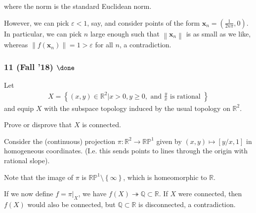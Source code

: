 \begin{solution}
where the norm is the standard Euclidean norm.

However, we can pick \(\varepsilon < 1\), say, and consider points of
the form \(\mathbf{x}_n = (\frac{1}{2n\pi}, 0)\). In particular, we can
pick \(n\) large enough such that
\({\left\lVert {\mathbf{x}_n} \right\rVert}\) is as small as we like,
whereas
\({\left\lVert {f(\mathbf{x}_n)} \right\rVert} = 1 > \varepsilon\) for
all \(n\), a contradiction.

\end{solution}

\hypertarget{fall-18-done}{%
\subsubsection{\texorpdfstring{11 (Fall '18)
\(\done\)}{11 (Fall '18) \textbackslash done}}\label{fall-18-done}}

Let
\begin{align*} X=\left\{(x, y) \in \mathbb{R}^{2} | x>0, y \geq 0, \text { and } \frac{y}{x} \text { is rational }\right\} \end{align*}
and equip \(X\) with the subspace topology induced by the usual topology
on \({\mathbb{R}}^2\).

Prove or disprove that \(X\) is connected.


\begin{solution}

\hfill

\begin{concept}

\hfill

\end{concept}

Consider the (continuous) projection
\(\pi: {\mathbb{R}}^2 \to {\mathbb{RP}}^1\) given by
\((x, y) \mapsto [y/x, 1]\) in homogeneous coordinates. (I.e. this sends
points to lines through the origin with rational slope).

Note that the image of \(\pi\) is
\({\mathbb{RP}}^1\setminus\left\{{\infty}\right\}\), which is
homeomorphic to \({\mathbb{R}}\).

If we now define \(f = {\left.{{\pi}} \right|_{{X}} }\), we have
\(f(X) \twoheadrightarrow{\mathbb{Q}}\subset {\mathbb{R}}\). If \(X\)
were connected, then \(f(X)\) would also be connected, but
\({\mathbb{Q}}\subset {\mathbb{R}}\) is disconnected, a contradiction.

\end{solution}

